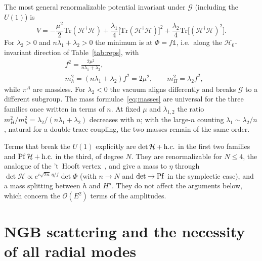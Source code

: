 \documentclass[aps,prd,twocolumn,superscriptaddress,nofootinbib,floatfix]{revtex4-2}
\theoremstyle{remark}
\newcommand{\Tr}{\mathrm{Tr}}
\newcommand{\Hf}{\mathcal{H}}      %
\newcommand{\G}{\mathcal{G}}
\newcommand{\Hg}{\mathcal{H}_0}    %
\newcommand{\ie}{i.e.}
\begin{document}
The most general renormalizable potential invariant under $\G$ (including the $U(1)$) is
\begin{equation}
V=-\frac{\mu^2}{2}\Tr(\Hf^\dagger\Hf)+\frac{\lambda_1}{4}\big[\Tr(\Hf^\dagger\Hf)\big]^2+\frac{\lambda_2}{4}\Tr\big[(\Hf^\dagger\Hf)^2\big].
\label{eq:V}
\end{equation}
For $\lambda_2>0$ and $n\lambda_1+\lambda_2>0$ the minimum is at $\Phi=f\mathbb{1}$, \ie\ along the $\Hg$-invariant direction of Table~\ref{tab:reps}, with
\begin{equation}
\begin{split}
&f^2=\frac{2\mu^2}{n\lambda_1+\lambda_2},\\
&m_h^2=(n\lambda_1+\lambda_2)f^2=2\mu^2,\qquad m_H^2=\lambda_2f^2 ,
\end{split}
\label{eq:masses}
\end{equation}
while $\pi^A$ are massless. For $\lambda_2<0$ the vacuum aligns differently and breaks $\G$ to a different subgroup. The mass formulae~\eqref{eq:masses} are universal for the three families once written in terms of $n$. At fixed $\mu$ and $\lambda_{1,2}$ the ratio $m_H^2/m_h^2=\lambda_2/(n\lambda_1+\lambda_2)$ decreases with $n$; with the large-$n$ counting $\lambda_1\sim\lambda_2/n$, natural for a double-trace coupling, the two masses remain of the same order.

Terms that break the $U(1)$ explicitly are $\det\Hf+{\rm h.c.}$ in the first two families and ${\rm Pf}\,\Hf+{\rm h.c.}$ in the third, of degree $N$. They are renormalizable for $N\leq4$, the analogue of the 't~Hooft vertex~\cite{tHooft:1976rip}, and give a mass to $\eta$ through $\det\Hf\propto e^{i\sqrt{2n}\,\eta/f}\det\Phi$ (with $n\to N$ and $\det\to{\rm Pf}$ in the symplectic case), and a mass splitting between $h$ and $H^a$. They do not affect the arguments below, which concern the $\mathcal{O}(E^2)$ terms of the amplitudes.

\section{NGB scattering and the necessity of all radial modes}
\label{sec:scattering}
\end{document}
